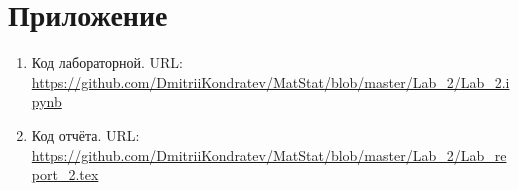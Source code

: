 \documentclass[12pt,a4paper]{article}
\begin{document}
	\section{Приложение}
	\begin{enumerate}
		\item Код лабораторной. URL: \url{https://github.com/DmitriiKondratev/MatStat/blob/master/Lab_2/Lab_2.ipynb}
		
		\item Код отчёта. URL: \url{https://github.com/DmitriiKondratev/MatStat/blob/master/Lab_2/Lab_report_2.tex}
		
	\end{enumerate}
\end{document}
